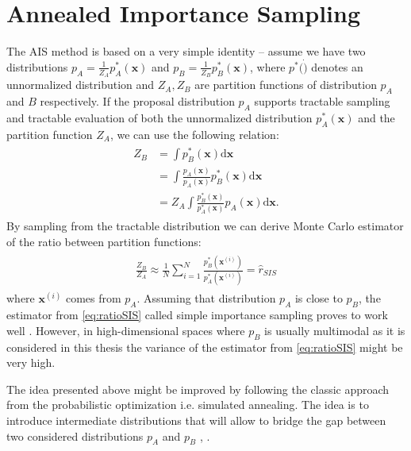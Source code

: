 \section{Annealed Importance Sampling }
The AIS method is based on a very simple identity -- assume we have two distributions $p_A= \frac{1}{Z_A}p_A^*(\mathbf{x})$ and $p_B= \frac{1}{Z_B}p_B^*(\mathbf{x})$, where $p^*(\dot)$ denotes an unnormalized distribution and $Z_A, Z_B$ are partition functions of distribution $p_A$ and $B$ respectively. If the proposal distribution $p_A$ supports tractable sampling and tractable evaluation of both the unnormalized distribution $p_A^*(\mathbf{x})$ and the partition function $Z_A$, we can use the following relation:
\begin{align}
\begin{split}
Z_B & = \int p^*_B(\mathbf{x}) \text{d} \mathbf{x} \\ 
 &= \int \frac{p_A(\mathbf{x})}{p_A(\mathbf{x})} p^*_B(\mathbf{x}) \text{d} \mathbf{x}\\
 &=  Z_A \int \frac{ p^*_B(\mathbf{x}) }{ p^*_A(\mathbf{x}) }p_A(\mathbf{x})  \text{d} \mathbf{x} .
\end{split}
\end{align}
By sampling from the tractable distribution we can derive Monte Carlo estimator of the ratio between partition functions:
\begin{align}
\begin{split}
\frac{Z_B}{Z_A} \approx \frac{1}{N} \sum_{i=1}^N \frac{ p^*_B(\mathbf{x}^{(i)}) }{ p^*_A(\mathbf{x}^{(i)}) } = \hat{r}_{SIS}
\label{eq:ratioSIS}
\end{split}
\end{align}
where $\mathbf{x}^{(i)}$ comes from $p_A$.
Assuming that distribution $p_A$ is close to $p_B$, the estimator from  \ref{eq:ratioSIS} called simple importance sampling proves to work well \cite{minka2005divergence}. However, in high-dimensional spaces where $p_B$ is usually multimodal as it is considered in this thesis the variance of the estimator from \ref{eq:ratioSIS} might be very high. 

The idea presented above might be improved by following the classic approach from the probabilistic optimization i.e. simulated annealing. The idea is to introduce intermediate distributions that will allow to bridge the gap between two considered distributions $p_A$ and $p_B$ \cite{jarzynski1997nonequilibrium}, \cite{neal2001annealed}.

